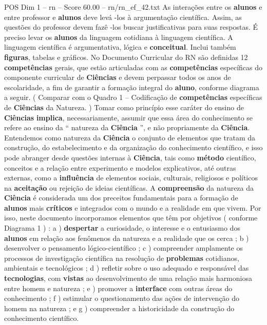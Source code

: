 \begin{textsample}{POS Dim 1 – rn – Score 60.00 – rn/rn\_ef\_42.txt}
As interações entre os \textbf{alunos} e entre professor e \textbf{alunos} deve levá -los à argumentação científica.
Assim, as questões do professor devem fazê -los buscar justificativas para suas respostas.
É preciso levar os \textbf{alunos} da linguagem cotidiana à linguagem científica.
A linguagem científica é argumentativa, lógica e \textbf{conceitual}.
Inclui também \textbf{figuras}, tabelas e gráficos.
No Documento Curricular do RN são definidas 12 \textbf{competências} gerais, que estão articuladas com as \textbf{competências} específicas do componente curricular de \textbf{Ciências} e devem perpassar todos os anos de escolaridade, a fim de garantir a formação integral do \textbf{aluno}, conforme diagrama a seguir. ( Comparar com o Quadro 1 – Codificação de \textbf{competências} específicas de \textbf{Ciências} da Natureza. ) Tomar como princípio esse caráter do ensino de \textbf{Ciências} \textbf{implica}, necessariamente, assumir que essa área do conhecimento se refere ao ensino da “ natureza da \textbf{Ciência} ”, e não propriamente da \textbf{Ciência}.
Entendemos como natureza da \textbf{Ciência} o conjunto de elementos que tratam da construção, do estabelecimento e da organização do conhecimento científico, e isso pode abranger desde questões internas à \textbf{Ciência}, tais como \textbf{método} científico, conceitos e a relação entre experimento e modelos explicativos, até outras externas, como a \textbf{influência} de elementos sociais, culturais, religiosos e políticos na \textbf{aceitação} ou rejeição de ideias científicas.
A \textbf{compreensão} da natureza da \textbf{Ciência} é considerada um dos preceitos fundamentais para a formação de \textbf{alunos} mais \textbf{críticos} e integrados com o mundo e a realidade em que vivem.
Por isso, neste documento incorporamos elementos que têm por objetivos ( conforme Diagrama 1 ) : a ) \textbf{despertar} a curiosidade, o interesse e o entusiasmo dos \textbf{alunos} em relação aos fenômenos da natureza e a realidade que os cerca ; b ) desenvolver o pensamento lógico-científico ; c ) compreender amplamente os processos de investigação científica na resolução de \textbf{problemas} cotidianos, ambientais e tecnológicos ; d ) refletir sobre o uso adequado e responsável das \textbf{tecnologias}, com \textbf{vistas} ao desenvolvimento de uma relação mais harmoniosa entre homem e natureza ; e ) promover a \textbf{interface} com outras áreas do conhecimento ; f ) estimular o questionamento das ações de intervenção do homem na natureza ; e g ) compreender a historicidade da construção do conhecimento científico.

\end{textsample}
